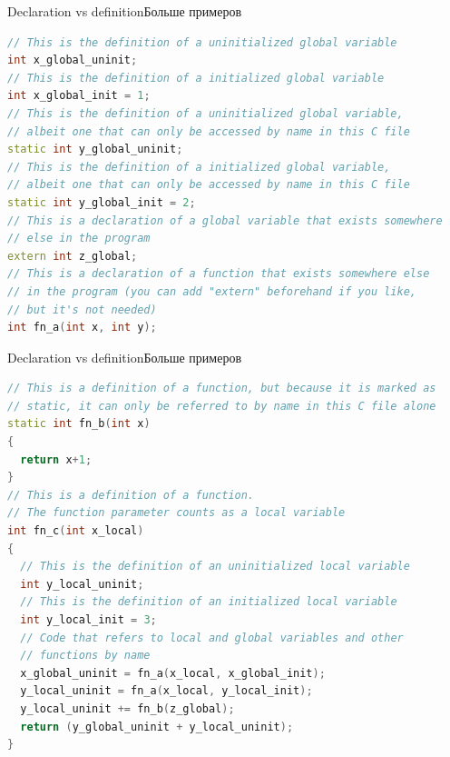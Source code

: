 \documentclass[10pt]{beamer}
\begin{document}
\begin{frame}[fragile]{Declaration vs definition}{Больше примеров}
\begin{lstlisting}[language=C++]
// This is the definition of a uninitialized global variable
int x_global_uninit;
// This is the definition of a initialized global variable
int x_global_init = 1;
// This is the definition of a uninitialized global variable, 
// albeit one that can only be accessed by name in this C file 
static int y_global_uninit;
// This is the definition of a initialized global variable, 
// albeit one that can only be accessed by name in this C file
static int y_global_init = 2;
// This is a declaration of a global variable that exists somewhere
// else in the program
extern int z_global;
// This is a declaration of a function that exists somewhere else 
// in the program (you can add "extern" beforehand if you like, 
// but it's not needed)
int fn_a(int x, int y);
\end{lstlisting}
\end{frame}

\begin{frame}[fragile]{Declaration vs definition}{Больше примеров}
\begin{lstlisting}[language=C++]
// This is a definition of a function, but because it is marked as
// static, it can only be referred to by name in this C file alone
static int fn_b(int x)
{
  return x+1;
}
// This is a definition of a function.
// The function parameter counts as a local variable
int fn_c(int x_local)
{
  // This is the definition of an uninitialized local variable
  int y_local_uninit;
  // This is the definition of an initialized local variable
  int y_local_init = 3;
  // Code that refers to local and global variables and other
  // functions by name
  x_global_uninit = fn_a(x_local, x_global_init);
  y_local_uninit = fn_a(x_local, y_local_init);
  y_local_uninit += fn_b(z_global);
  return (y_global_uninit + y_local_uninit);
}
\end{lstlisting}
\end{frame}
\end{document}
